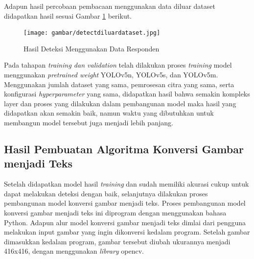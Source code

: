 Adapun hasil percobaan pembacaan menggunakan data diluar dataset didapatkan hasil sesuai Gambar \ref*{fig:detectbaru} berikut.

\begin{figure}[H]
  \centering
  \texttt{[image: gambar/detectdiluardataset.jpg]}
  \caption{Hasil Deteksi Menggunakan Data Responden}
  \label{fig:detectbaru}
\end{figure}


Pada tahapan \textit{training \textnormal{dan} validation} telah dilakukan proses \textit{training} model menggunakan \textit{pretrained weight} YOLOv5n, YOLOv5s, dan YOLOv5m. Menggunakan jumlah dataset yang sama, pemrosesan citra yang sama, serta konfigurasi \textit{hyperparameter} yang sama, didapatkan hasil bahwa semakin kompleks layer dan proses yang dilakukan dalam pembangunan model maka hasil yang didapatkan akan semakin baik, namun waktu yang dibutuhkan untuk membangun model tersebut juga menjadi lebih panjang.


\subsection{Hasil Pembuatan Algoritma Konversi Gambar menjadi Teks}
\label{subsec:hasilmembangunmodel}

Setelah didapatkan model hasil \textit{training} dan sudah memiliki akurasi cukup untuk dapat melakukan deteksi dengan baik, selanjutnya dilakukan proses pembangunan model konversi gambar menjadi teks. Proses pembangunan model konversi gambar menjadi teks ini diprogram dengan menggunakan bahasa Python. Adapun alur model konversi gambar menjadi teks dimlai dari pengguna melakukan input gambar yang ingin dikonversi kedalam program. Setelah gambar dimasukkan kedalam program, gambar tersebut diubah ukurannya menjadi 416x416, dengan menggunakan \textit{library} opencv. \par

